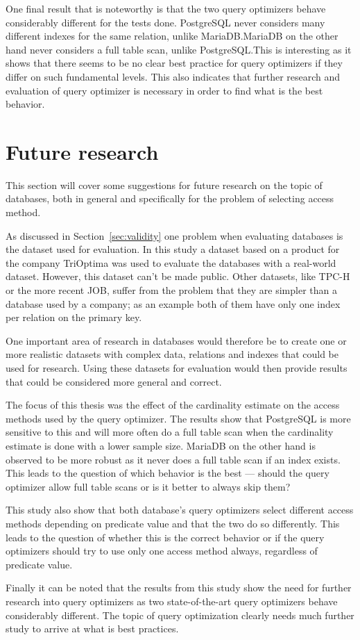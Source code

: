 One final result that is noteworthy is that the two query optimizers behave
considerably different for the tests done. PostgreSQL never considers
many different indexes for the same relation, unlike MariaDB.\@ MariaDB on the
other hand never considers a full table scan, unlike PostgreSQL.\@ This is
interesting as it shows that there seems to be no clear best practice for query
optimizers if they differ on such fundamental levels. This also indicates that
further research and evaluation of query optimizer is necessary in order to find
what is the best behavior.

\section{Future research}
This section will cover some suggestions for future research on the topic of
databases, both in general and specifically for the problem of selecting access method.

As discussed in Section~\ref{sec:validity} one problem when evaluating
databases is the dataset used for evaluation. In this study a dataset based on a
product for the company TriOptima was used to evaluate the databases with a real-world
dataset. However, this dataset can't be made public. Other datasets, like TPC-H
or the more recent JOB, suffer from the problem that they are simpler
than a database used by a company; as an example both of them have only one
index per relation on the primary key.

One important area of research in databases would therefore be to create one or
more realistic datasets with complex data, relations and indexes that could be
used for research. Using these datasets for evaluation would then provide
results that could be considered more general and correct.

The focus of this thesis was the effect of the cardinality estimate on the
access methods used by the query optimizer. The results show that PostgreSQL is
more sensitive to this and will more often do a full table scan when the
cardinality estimate is done with a lower sample size. MariaDB on the other hand
is observed to be more robust as it never does a full table scan if an index
exists. This leads to the question of which behavior is the best --- should the
query optimizer allow full table scans or is it better to always skip them?

This study also show that both database's query optimizers select
different access methods depending on predicate value and that the two do so
differently. This leads to the question of whether this is the correct behavior
or if the query optimizers should try to use only one access method always,
regardless of predicate value.

Finally it can be noted that the results from this study show the need for
further research into query optimizers as two state-of-the-art query optimizers
behave considerably different. The topic of query optimization clearly needs
much further study to arrive at what is best practices.
